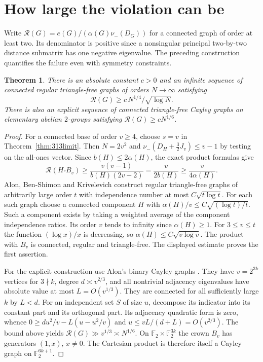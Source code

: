 \documentclass[11pt,a4paper]{article}
\newtheorem{theorem}{Theorem}[section]
\newcommand{\RhoG}{\mathcal R}
\begin{document}
\section{How large the violation can be}\label{sec:ram}
Write $\RhoG(G)=e(G)/(\alpha(G)\nu_-(D_G))$ for a connected graph of order
at least two. Its denominator is positive since a nonsingular principal
two-by-two distance submatrix has one negative eigenvalue.
The preceding construction quantifies the failure even with symmetry constraints.
\begin{theorem}\label{thm:growth}
There is an absolute constant $c>0$ and an infinite sequence of connected
regular triangle-free graphs of orders $N\to\infty$ satisfying
\[
 \RhoG(G)\ge c\,N^{1/4}/\sqrt{\log N}.
\]
There is also an explicit sequence of connected triangle-free Cayley
graphs on elementary abelian $2$-groups satisfying $\RhoG(G)\ge cN^{1/6}$.
\end{theorem}
\begin{proof}
For a connected base of order $v\ge4$, choose $s=v$ in
Theorem~\ref{thm:313limit}. Then $N=2v^2$ and
$\nu_-(D_H+\tfrac32J_v)\le v-1$ by testing on the all-ones vector.
Since $b(H)\le2\alpha(H)$, the exact product formulas give
\[
 \RhoG(H\square B_v)
 \ge \frac{v(v-1)}{b(H)(2v-2)}
 =\frac{v}{2b(H)}\ge\frac{v}{4\alpha(H)}.
\]
Alon, Ben-Shimon and Krivelevich \cite[Thm.~1.1]{abs}
construct regular triangle-free graphs of arbitrarily large order $t$
with independence number at most $C\sqrt{t\log t}$. For each such
graph choose a connected component $H$ with
$\alpha(H)/v\le C\sqrt{(\log t)/t}$. Such a component exists by taking
a weighted average of the component independence ratios. Its order $v$
tends to infinity since $\alpha(H)\ge1$. For $3\le v\le t$ the function
$(\log x)/x$ is decreasing, so $\alpha(H)\le C\sqrt{v\log v}$.
The product with $B_v$ is connected, regular and triangle-free. The
displayed estimate proves the first assertion.

For the explicit construction use Alon's binary Cayley graphs
\cite[Thm.~2.1]{alon}. They have $v=2^{3k}$ vertices for $3\nmid k$,
degree $d\asymp v^{2/3}$, and all nontrivial adjacency eigenvalues have
absolute value at most $L=O(v^{1/3})$. They are connected for all
sufficiently large $k$ by $L<d$. For an independent set $S$ of size $u$,
decompose its indicator into its constant part and its orthogonal part.
Its adjacency quadratic form is zero, whence
$0\ge d u^2/v-L(u-u^2/v)$ and $u\le vL/(d+L)=O(v^{2/3})$.
The bound above yields $\RhoG(G)\gg v^{1/3}\asymp N^{1/6}$.
On $\mathbb F_2\times\mathbb F_2^{3k}$ the crown $B_v$ has generators
$(1,x)$, $x\ne0$. The Cartesian product is therefore itself a Cayley
graph on $\mathbb F_2^{6k+1}$.
\end{proof}
\end{document}
